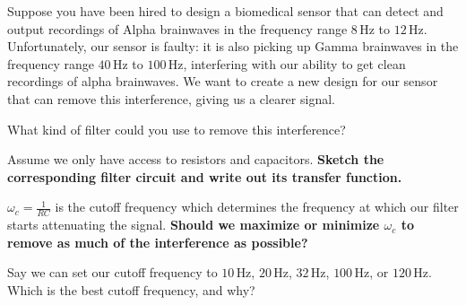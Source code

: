 

Suppose you have been hired to design a biomedical sensor that can detect and output recordings of Alpha brainwaves in the frequency range $8 \, \text{Hz}$ to $12 \, \text{Hz}$. 
Unfortunately, our sensor is faulty: it is also picking up Gamma brainwaves in the frequency range $40 \, \text{Hz}$ to $100 \, \text{Hz}$, interfering with our ability to get clean recordings of alpha brainwaves. 
We want to create a new design for our sensor that can remove this interference, giving us a clearer signal.

\begin{enumerate}
  \qitem What kind of filter could you use to remove this interference? 
  
  
  \qitem Assume we only have access to resistors and capacitors. \textbf{Sketch the corresponding filter circuit and write out its transfer function.} 


  \qitem $\omega_{c} = \frac{1}{RC}$ is the cutoff frequency which determines the frequency at which our filter starts attenuating the signal. \textbf{Should we maximize or minimize $\omega_{c}$ to remove as much of the interference as possible?}


  \qitem Say we can set our cutoff frequency to $10 \, \text{Hz}$, $20 \, \text{Hz}$, $32 \, \text{Hz}$, $100 \, \text{Hz}$, or $120 \, \text{Hz}$. Which is the best cutoff frequency, and why?



\end{enumerate}
